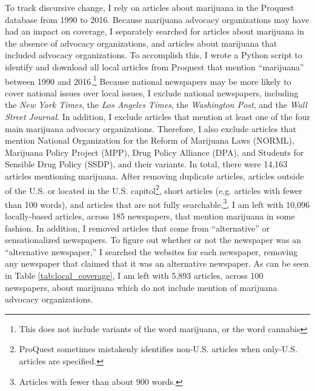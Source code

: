 To track discursive change, I rely on articles about marijuana in the Proquest database from 1990 to 2016. Because marijuana advocacy organizations may have had an impact on coverage, I separately searched for articles about marijuana in the absence of advocacy organizations, and articles about marijuana that included advocacy organizations. To accomplish this,  I wrote a Python script to identify and download all local articles from Proquest that mention ``marijuana'' between 1990 and 2016.\footnote{This does not include variants of the word marijuana, or the word cannabis} Because national newspapers may be more likely to cover national issues over local issues, I exclude national newspapers, including the \textit{New York Times}, the \textit{Los Angeles Times}, the \textit{Washington Post}, and the \textit{Wall Street Journal}. In addition, I exclude articles that mention at least one of the four main marijuana advocacy organizations. Therefore, I also exclude articles that mention National Organization for the Reform of Marijuana Laws (NORML), Marijuana Policy Project (MPP), Drug Policy Alliance (DPA), and Students for Sensible Drug Policy (SSDP), and their variants. In total, there were 14,163 articles mentioning marijuana. After removing duplicate articles, articles outside of the U.S. or located in the U.S. capitol\footnote{ProQuest sometimes mistakenly identifies non-U.S. articles when only-U.S. articles are specified.}, short articles (e.g. articles with fewer than 100 words), and articles that are not fully searchable,\footnote{Articles with fewer than about 900 words.}, I am left with 10,096 locally-based articles, across 185 newspapers, that mention marijuana in some fashion. In addition, I removed articles that come from ``alternative'' or sensationalized newspapers. To figure out whether or not the newspaper was an ``alternative newspaper,'' I searched the websites for each newspaper, removing any newspaper that claimed that it was an alternative newspaper. As can be seen in Table \ref{tab:local_coverage}, I am left with 5,893 articles, across 100 newspapers, about marijuana which do not include mention of marijuana advocacy organizations. %





